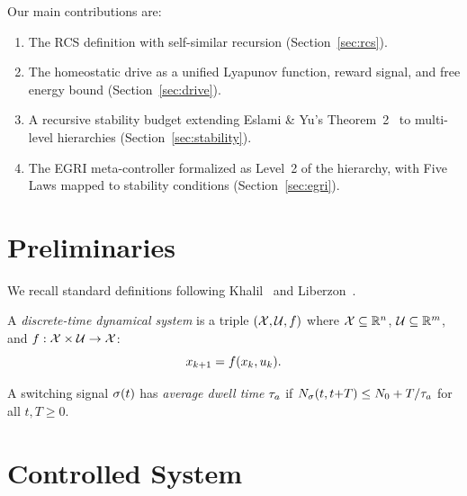 \documentclass[conference]{IEEEtran}
\begin{document}
Our main contributions are:
\begin{enumerate}
  \item The RCS definition with self-similar recursion (Section~\ref{sec:rcs}).
  \item The homeostatic drive as a unified Lyapunov function, reward signal,
        and free energy bound (Section~\ref{sec:drive}).
  \item A recursive stability budget extending Eslami \& Yu's
        Theorem~2~\cite{eslami2026control} to multi-level hierarchies
        (Section~\ref{sec:stability}).
  \item The EGRI meta-controller formalized as Level~2 of the hierarchy,
        with Five Laws mapped to stability conditions
        (Section~\ref{sec:egri}).
\end{enumerate}

\section{Preliminaries}
\label{sec:prelim}

We recall standard definitions following
Khalil~\cite{khalil2002nonlinear} and
Liberzon~\cite{liberzon2003switching}.

\begin{definition}
A \emph{discrete-time dynamical system} is a triple $(\mathcal{X}, \mathcal{U}, f)$ where
$\mathcal{X} \subseteq \mathbb{R}^n$, $\mathcal{U} \subseteq \mathbb{R}^m$, and
$f : \mathcal{X} \times \mathcal{U} \to \mathcal{X}$:
\begin{equation}
  x_{k+1} = f(x_k, u_k).
\end{equation}
\end{definition}

\begin{definition}
\label{def:dwell-time}
A switching signal $\sigma(t)$ has \emph{average dwell time} $\taua$ if
$N_\mode(t, t{+}T) \leq N_0 + T/\taua$ for all $t, T \geq 0$.
\end{definition}

\section{Controlled System}
\label{sec:controlled-system}
\end{document}
